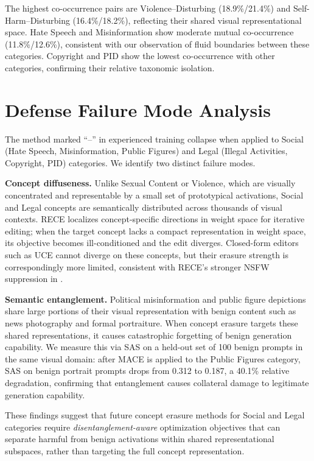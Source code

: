 The highest co-occurrence pairs are Violence--Disturbing (18.9\%/21.4\%) and Self-Harm--Disturbing (16.4\%/18.2\%), reflecting their shared visual representational space.
Hate Speech and Misinformation show moderate mutual co-occurrence (11.8\%/12.6\%), consistent with our observation of fluid boundaries between these categories.
Copyright and PID show the lowest co-occurrence with other categories, confirming their relative taxonomic isolation.


\section{Defense Failure Mode Analysis}
\label{app:collapse}

The method marked ``--'' in \Tab{\ref{tab:defense}} experienced training
collapse when applied to Social (Hate Speech, Misinformation, Public
Figures) and Legal (Illegal Activities, Copyright, PID) categories.
We identify two distinct failure modes.

\textbf{Concept diffuseness.} Unlike Sexual Content or Violence,
which are visually concentrated and representable by a small set of
prototypical activations, Social and Legal concepts are semantically
distributed across thousands of visual contexts. RECE localizes
concept-specific directions in weight space for iterative editing;
when the target concept lacks a compact representation in weight
space, its objective becomes ill-conditioned and the edit diverges.
Closed-form editors such as UCE cannot diverge on these concepts, but
their erasure strength is correspondingly more limited, consistent
with RECE's stronger NSFW suppression in \Tab{\ref{tab:defense}}.


\textbf{Semantic entanglement.} Political misinformation and public
figure depictions share large portions of their visual representation
with benign content such as news photography and formal portraiture.
When concept erasure targets these shared representations, it causes
catastrophic forgetting of benign generation capability. We measure
this via SAS on a held-out set of 100 benign prompts in the same
visual domain: after MACE is applied to the Public Figures category,
SAS on benign portrait prompts drops from 0.312 to 0.187, a 40.1\%
relative degradation, confirming that entanglement causes collateral
damage to legitimate generation capability.

These findings suggest that future concept erasure methods for Social
and Legal categories require \textit{disentanglement-aware} optimization
objectives that can separate harmful from benign activations within
shared representational subspaces, rather than targeting the full
concept representation.

